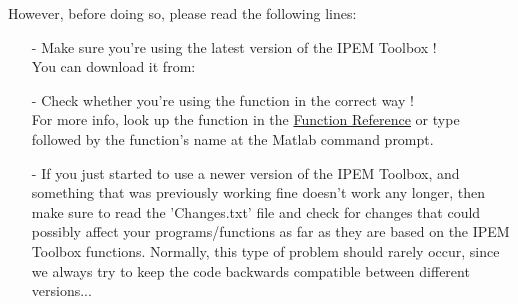 However, before doing so, please read the following lines:
\begin{enumerate}
    \item[-]
    Make sure you're using the latest version of the IPEM Toolbox $!$\\
    You can download it from: 
    \item[-]
    Check whether you're using the function in the correct way $!$\\
    For more info, look up the function in the \hyperlink{Chapter:FuncRef}{Function Reference}
    or type  followed by the function's name at the Matlab command prompt.
    \item[-]
    If you just started to use a newer version of the IPEM Toolbox, and something that was
    previously working fine doesn't work any longer, then make sure to read the 'Changes.txt'
    file and check for changes that could possibly affect your programs/functions as far as
    they are based on the IPEM Toolbox functions. Normally, this type of problem should rarely
    occur, since we always try to keep the code backwards compatible between different
    versions...
\end{enumerate}

